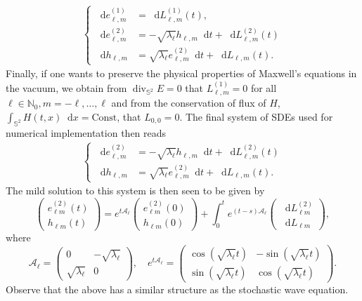 \documentclass[11pt]{amsart}
\newcommand{\N}{{\mathbb N}}
\newcommand{\IS}{\mathbb{S}}
\newcommand*\dd{\mathop{}\!\mathrm{d}}
\begin{document}
\begin{align}\label{eq:max-fin}
	\begin{cases}
	\dd e^{(1)}_{\ell,m}&=\dd L^{(1)}_{\ell,m}(t),\\
	\dd e^{(2)}_{\ell,m}&=-\sqrt{\lambda_\ell} h_{\ell,m}\dd t+\dd L^{(2)}_{\ell,m}(t)\\
	\dd h_{\ell,m}&=\sqrt{\lambda_\ell}e^{(2)}_{\ell,m}\dd t+\dd L_{\ell,m}(t).
	\end{cases}
\end{align}
Finally, if one wants to preserve the physical properties of Maxwell's equations in the vacuum,
we obtain from $\operatorname{div}_{\IS^2}E=0$ that
$L^{(1)}_{\ell,m}=0$ for all $\ell \in \N_0, m=-\ell, \dots, \ell$ 
and from the conservation of flux of $H$, $\int_{\IS^{2}}H(t,x)\dd x=\text{Const}$, that 
$L_{0,0}=0$.
The final system of SDEs used for numerical implementation then reads
\begin{align}\label{eq:max_modes}
	\begin{cases}
		\dd e^{(2)}_{\ell,m}&=-\sqrt{\lambda_\ell}h_{\ell,m}\dd t+\dd L^{(2)}_{\ell,m}(t)\\
		\dd h_{\ell,m}&=\sqrt{\lambda_\ell}e^{(2)}_{\ell,m}\dd t+\dd L_{\ell,m}(t).
	\end{cases}
\end{align}
The mild solution to this system is then seen to be given by
\[
\begin{pmatrix}
	e^{(2)}_{\ell m}(t) \\
	h_{\ell m}(t)
\end{pmatrix}
=
e^{t\mathcal A_\ell}
\begin{pmatrix}
	e^{(2)}_{\ell m}(0) \\
	h_{\ell m}(0)
\end{pmatrix}
+
\int_0^t
e^{(t-s)\mathcal A_\ell}
\begin{pmatrix}
	\dd L^{(2)}_{\ell m} \\
	\dd L_{\ell m}
\end{pmatrix},
\]
where
\[
\mathcal A_\ell
=
\begin{pmatrix}
	0 & -\sqrt{\lambda_\ell} \\
	\sqrt{\lambda_\ell} & 0
\end{pmatrix},
\quad
e^{t\mathcal A_\ell}
=
\begin{pmatrix}
	\cos(\sqrt{\lambda_\ell} t) & -\sin(\sqrt{\lambda_\ell}t) \\
	\sin(\sqrt{\lambda_\ell} t) & \cos(\sqrt{\lambda_\ell} t)
\end{pmatrix}.
\]
Observe that the above has a similar structure as the stochastic wave equation.
\end{document}
